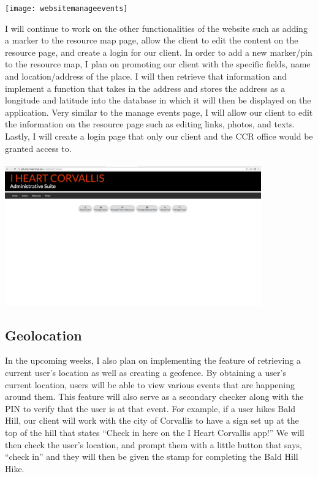 \documentclass[onecolumn, draftclsnofoot,10pt, compsoc]{IEEEtran}
\begin{document}
		\texttt{[image: websitemanageevents]}

		I will continue to work on the other functionalities of the website such as adding a marker to the resource map page, allow the client to edit the content on the resource page, and create a login for our client. In order to add a new marker/pin to the resource map, I plan on promoting our client with the specific fields, name and location/address of the place. I will then retrieve that information and implement a function that takes in the address and stores the address as a longitude and latitude into the database in which it will then be displayed on the application. Very similar to the manage events page, I will allow our client to edit the information on the resource page such as editing links, photos, and texts. Lastly, I will create a login page that only our client and the CCR office would be granted access to. \\ \\

		\includegraphics[height=6cm]{websitehomepage}

	\subsection{Geolocation}
		In the upcoming weeks, I also plan on implementing the feature of retrieving a current user’s location as well as creating a geofence. By obtaining a user’s current location, users will be able to view various events that are happening around them. This feature will also serve as a secondary checker along with the PIN to verify that the user is at that event. For example, if a user hikes Bald Hill, our client will work with the city of Corvallis to have a sign set up at the top of the hill that states “Check in here on the I Heart Corvallis app!” We will then check the user’s location, and prompt them with a little button that says, “check in” and they will then be given the stamp for completing the Bald Hill Hike.
\end{document}
